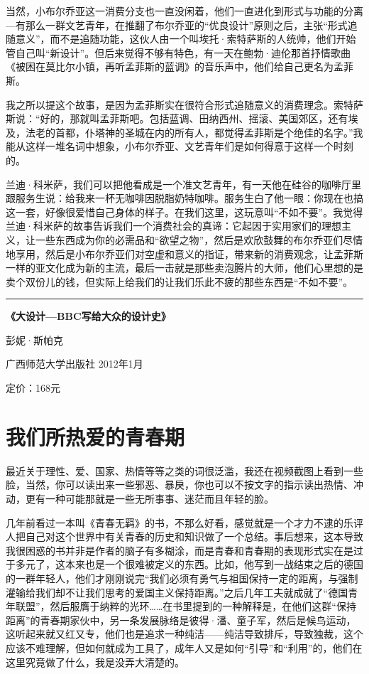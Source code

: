当然，小布尔乔亚这一消费分支也一直没闲着，他们一直进化到形式与功能的分离---有那么一群文艺青年，在推翻了布尔乔亚的``优良设计''原则之后，主张``形式追随意义''，而不是追随功能，这伙人由一个叫埃托·索特萨斯的人统帅，他们开始管自己叫``新设计''。但后来觉得不够有特色，有一天在鲍勃·迪伦那首抒情歌曲《被困在莫比尔小镇，再听孟菲斯的蓝调》的音乐声中，他们给自己更名为孟菲斯。

我之所以提这个故事，是因为孟菲斯实在很符合形式追随意义的消费理念。索特萨斯说：``好的，那就叫孟菲斯吧。包括蓝调、田纳西州、摇滚、美国郊区，还有埃及，法老的首都，仆塔神的圣城在内的所有人，都觉得孟菲斯是个绝佳的名字。''我能从这样一堆名词中想象，小布尔乔亚、文艺青年们是如何得意于这样一个时刻的。

兰迪·科米萨，我们可以把他看成是一个准文艺青年，有一天他在硅谷的咖啡厅里跟服务生说：给我来一杯无咖啡因脱脂奶特咖啡。服务生白了他一眼：你现在也搞这一套，好像很爱惜自己身体的样子。在我们这里，这玩意叫``不如不要''。我觉得兰迪·科米萨的故事告诉我们一个消费社会的真谛：它起因于实用家们的理想主义，让一些东西成为你的必需品和``欲望之物''，然后是欢欣鼓舞的布尔乔亚们尽情地享用，然后是小布尔乔亚们对空虚和意义的指证，带来新的消费观念，让孟菲斯一样的亚文化成为新的主流，最后一击就是那些卖泡腾片的大师，他们心里想的是卖个双份儿的钱，但实际上给我们的让我们乐此不疲的那些东西是``不如不要''。

\begin{center}\rule{0.5\linewidth}{0.5pt}\end{center}

\textbf{《大设计---BBC写给大众的设计史》}

彭妮·斯帕克

广西师范大学出版社 2012年1月

定价：168元

\hypertarget{ux6211ux4eecux6240ux70edux7231ux7684ux9752ux6625ux671f}{%
\section{我们所热爱的青春期}\label{ux6211ux4eecux6240ux70edux7231ux7684ux9752ux6625ux671f}}

最近关于理性、爱、国家、热情等等之类的词很泛滥，我还在视频截图上看到一些脸，当然，你可以读出来一些邪恶、暴戾，你也可以不按文字的指示读出热情、冲动，更有一种可能那就是一些无所事事、迷茫而且年轻的脸。

几年前看过一本叫《青春无羁》的书，不那么好看，感觉就是一个才力不逮的乐评人把自己对这个世界中有关青春的历史和知识做了一个总结。事后想来，这本导致我很困惑的书并非是作者的脑子有多糊涂，而是青春和青春期的表现形式实在是过于多元了，这本来也是一个很难被定义的东西。比如，他写到一战结束之后的德国的一群年轻人，他们才刚刚说完``我们必须有勇气与祖国保持一定的距离，与强制灌输给我们却不让我们思考的爱国主义保持距离。''之后几年工夫就成就了``德国青年联盟''，然后服膺于纳粹的光环\ldots\ldots 在书里提到的一种解释是，在他们这群``保持距离''的青春期家伙中，另一条发展脉络是彼得·潘、童子军，然后是候鸟运动，这听起来就又红又专，他们也是追求一种纯洁------纯洁导致排斥，导致独裁，这个应该不难理解，但如何就成为工具了，成年人又是如何``引导''和``利用''的，他们在这里究竟做了什么，我是没弄大清楚的。

